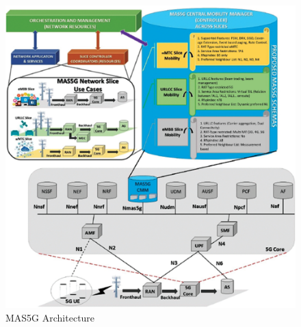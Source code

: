 \begin{figure}[H]
\centering
\includegraphics[scale=.86]{src/Figures/chap1/chap1-fig03.jpg}
\caption{MAS5G Architecture}\label{chap1-fig03}
\end{figure}

